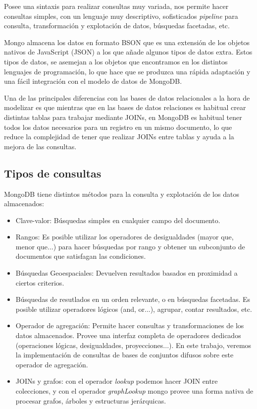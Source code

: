 Posee una sintaxis para realizar consultas muy variada, nos permite hacer consultas simples, con un lenguaje muy descriptivo, sofisticados \textit{pipeline} para consulta, transformación y explotación de datos, búsquedas facetadas, etc.

Mongo almacena los datos en formato BSON \cite{bsonspec} que es una extensión de los objetos nativos de JavaScript (JSON) a los que añade algunos tipos de datos extra. Estos tipos de datos, se asemejan a los objetos que encontramos en los distintos lenguajes de programación, lo que hace que se produzca una rápida adaptación y una fácil integración con el modelo de datos de MongoDB.

Una de las principales diferencias con las bases de datos relacionales a la hora de modelizar es que mientras que en las bases de datos relaciones es habitual crear distintas tablas para trabajar mediante JOINs, en MongoDB es habitual tener todos los datos necesarios para un registro en un mismo documento, lo que reduce la complejidad de tener que realizar JOINs entre tablas y ayuda a la mejora de las consultas.

\subsection{Tipos de consultas}

MongoDB tiene distintos métodos para la consulta y explotación de los datos almacenados:

\begin{itemize}
    \item Clave-valor: Búsquedas simples en cualquier campo del documento.
    \item Rangos: Es posible utilizar los operadores de desigualdades (mayor que, menor que...) para hacer búsquedas por rango y obtener un subconjunto de documentos que satisfagan las condiciones.
    \item Búsquedas Geoespaciales: Devuelven resultados basados en proximidad a ciertos criterios.
    \item Búsquedas de resutlados en un orden relevante, o en búsquedas facetadas. Es posible utilizar operadores lógicos (and, or...), agrupar, contar resultados, etc.
    \item Operador de agregación: Permite hacer consultas y transformaciones de los datos almacenados. Provee una interfaz completa de operadores dedicados (operaciones lógicas, desigualdades, proyecciones...). En este trabajo, veremos la implementación de consultas de bases de conjuntos difusos sobre este operador de agregación.
    \item JOINs y grafos: con el operador \textit{lookup} podemos hacer JOIN entre colecciones, y con el operador \textit{graphLookup} mongo provee una forma nativa de procesar grafos, árboles y estructuras jerárquicas.
\end{itemize}


